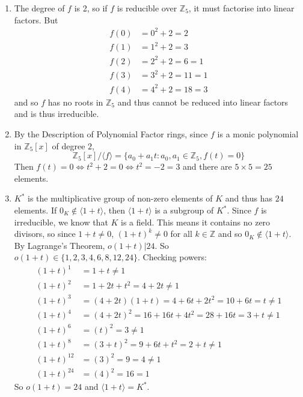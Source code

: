 \documentclass[11pt]{article}
\begin{document}
  \begin{enumerate}[label={(\alph*)}, left=16pt]
    \item The degree of $f$ is 2, so if $f$ is reducible over $\mathbb{Z}_5$, it must factorise into linear factors. But \begin{align*}
    f(0) & = 0^2 + 2 = 2 \\ 
    f(1) & = 1^2 + 2 = 3 \\ 
    f(2) & = 2^2 + 2 = 6 = 1 \\ 
    f(3) & = 3^2 + 2 = 11 = 1 \\ 
    f(4) & = 4^2 + 2 = 18 = 3 
    \end{align*}
    and so $f$ has no roots in $\mathbb{Z}_5$ and thus cannot be reduced into linear factors and is thus irreducible.
    \item By the Description of Polynomial Factor rings, since $f$ is a monic polynomial in $\mathbb{Z}_5[x]$ of degree $2$, \[
    \mathbb{Z}_5 [x] / \langle f \rangle = \{a_0 +a_1 t : a_0, a_1 \in \mathbb{Z}_5, f(t) = 0\}
    \]
    Then $f(t) = 0 \iff t^2 + 2 = 0 \iff t^2 = -2 = 3$ and there are $5 \times 5 = 25$ elements.
    \item $K^*$ is the multiplicative group of non-zero elements of $K$ and thus has $24$ elements. If $0_K \notin \langle 1+t \rangle$, then $\langle 1+t \rangle$ is a subgroup of $K^*$. Since $f$ is irreducible, we know that $K$ is a field. This means it contains no zero divisors, so since $1+t \ne 0$, $(1+t)^k \ne 0$ for all $k \in \mathbb{Z}$ and so $0_K \notin \langle 1+t \rangle$. By Lagrange's Theorem, $o(1+t) | 24$. So \\ $o(1+t) \in \{1,2,3,4,6,8,12,24\}$. Checking powers: \begin{align*}
      (1+t)^1 &= 1+t \ne 1 \\ 
      (1+t)^2 &= 1+2t+t^2 =4 + 2t \ne 1 \\ 
      (1+t)^3 &= (4+2t)(1+t) = 4 + 6t + 2t^2 = 10 + 6t = t \ne 1 \\ 
      (1+t)^4 &= (4+2t)^2 = 16 + 16t + 4t^2 = 28 + 16t = 3 + t \ne 1 \\ 
      (1+t)^6 &= (t)^2 = 3 \ne 1 \\ 
      (1+t)^8 &= (3+t)^2 = 9 + 6t + t^2 = 2 + t \ne 1 \\ 
      (1+t)^{12} &= (3)^2 = 9 = 4 \ne 1 \\ 
      (1+t)^{24} &= (4)^2 = 16 = 1 
    \end{align*}
    So $o(1+t) = 24$ and $\langle 1+t \rangle = K^*$.
  \end{enumerate}
\newpage
\end{document}

